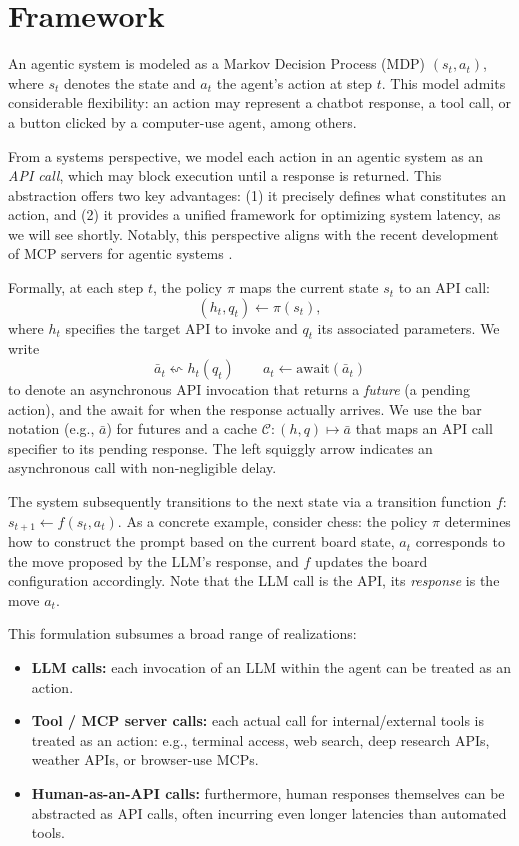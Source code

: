 \section{Framework}
\label{framework}
An agentic system is modeled as a Markov Decision Process (MDP) $(s_{t}, a_{t})$, where $s_{t}$ denotes the state and $a_{t}$ the agent’s action at step $t$. 
This model admits considerable flexibility: an action may represent a chatbot response, a tool call, or a button clicked by a computer-use agent, among others.  

From a systems perspective, we model each action in an agentic system as an \emph{API call}, which may block execution until a response is returned. This abstraction offers two key advantages: (1) it precisely defines what constitutes an action, and (2) it provides a unified framework for optimizing system latency, as we will see shortly.
Notably, this perspective aligns with the recent development of MCP servers for agentic systems \citep{anthropic2024model}.

Formally, at each step $t$, the policy $\pi$ maps the current state $s_{t}$ to an API call:
\[
(h_{t}, q_{t}) \gets \pi(s_{t}),
\]
where $h_{t}$ specifies the target API to invoke and $q_{t}$ its associated parameters. We write
\[\bar a_t \leftsquigarrow h_t(q_t)\qquad a_t \gets \mathrm{await}(\bar a_t)\] 
to denote an asynchronous API invocation that
returns a \emph{future} (a pending action), and the await for when the response actually arrives. We use the bar notation (e.g., $\bar a$) for futures and
a cache $\mathcal C:(h,q)\mapsto \bar a$ that maps an API call specifier to its pending response. The left squiggly arrow indicates an asynchronous call with non-negligible delay.

The system subsequently transitions to the next state via a transition function $f$: $
s_{t+1} \gets f(s_{t}, a_{t}).$
As a concrete example, consider chess: the policy $\pi$ determines how to construct the prompt 
based on the current board state, $a_{t}$ corresponds to the move proposed by the LLM’s response, 
and $f$ updates the board configuration accordingly. Note that the LLM call is the API, its \textit{response} is the move $a_t$. 


This formulation subsumes a broad range of realizations:
\begin{itemize}[leftmargin=*]
    \item \textbf{LLM calls:} each invocation of an LLM within the agent can be treated as an action.
    \item \textbf{Tool / MCP server calls:} each actual call for internal/external tools is treated as an action: e.g., terminal access, web search, deep research APIs, weather APIs, or browser-use MCPs.
    \item \textbf{Human-as-an-API calls:} furthermore, human responses themselves can be abstracted as API calls, often incurring even longer latencies than automated tools.
\end{itemize}

